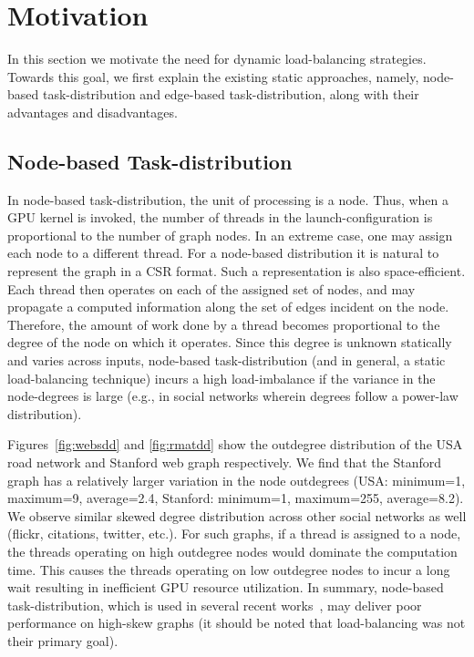 \section{Motivation}\label{motivation}
In this section we motivate the need for dynamic load-balancing strategies.
Towards this goal, we first explain the existing static approaches, namely, node-based task-distribution and edge-based task-distribution,
along with their advantages and disadvantages.

\subsection{Node-based Task-distribution}
In node-based task-distribution, the unit of processing is a node.
Thus, when a GPU kernel is invoked, the number of threads in the launch-configuration is proportional to the number of graph nodes.
In an extreme case, one may assign each node to a different thread.
For a node-based distribution it is natural to represent the graph in a CSR format.
Such a representation is also space-efficient.
Each thread then operates on each of the assigned set of nodes, and may propagate a computed information along the set of edges incident on the node.
Therefore, the amount of work done by a thread becomes proportional to the degree of the node on which it operates.
Since this degree is unknown statically and varies across inputs, node-based task-distribution (and in general, a static load-balancing technique)
incurs a high load-imbalance if the variance in the node-degrees is large (e.g., in social networks wherein degrees follow a power-law distribution).

Figures~\ref{fig:websdd} and \ref{fig:rmatdd} show the outdegree distribution of the USA road network and Stanford web graph respectively. 
We find that the Stanford graph has a relatively larger variation in the node outdegrees (USA: minimum=1, maximum=9, average=2.4, Stanford: minimum=1, maximum=255, average=8.2).
We observe similar skewed degree distribution across other social networks as well (flickr, citations, twitter, etc.).
For such graphs, if a thread is assigned to a node, the threads operating on high outdegree nodes would dominate the computation time.
This causes the threads operating on low outdegree nodes to incur a long wait resulting in inefficient GPU resource utilization. 
In summary, node-based task-distribution, which is used in several recent works~\cite{nasre-morphgpus-ppopp2013, nasre-datavstoplogy-ipdps2013, merrill-scalablegputraversal-ppopp2012, sariyuce-bc-gpgpu2013, gharaibeh-graphsgpus-ipdps2013}, may deliver poor performance on high-skew graphs (it should be noted that load-balancing was not their primary goal).


